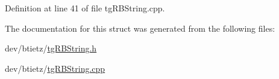 Definition at line 41 of file tg\-R\-B\-String.\-cpp.



The documentation for this struct was generated from the following files\-:\begin{DoxyCompactItemize}
\item 
dev/btietz/\hyperlink{tg_r_b_string_8h}{tg\-R\-B\-String.\-h}\item 
dev/btietz/\hyperlink{tg_r_b_string_8cpp}{tg\-R\-B\-String.\-cpp}\end{DoxyCompactItemize}
